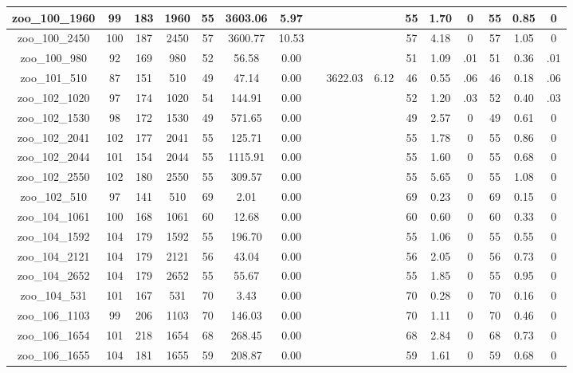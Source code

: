 \begin{landscape}
\begin{longtable}{|c|c|c|c|c|c|c|c|c|c|c|c|c|c|c|c|}
zoo\_100\_1960 & 99 & 183 & 1960 & 55 & 3603.06 & 5.97 &  &  &  & 55 & 1.70 & 0 & 55 & 0.85 & 0 \\ \hline 
zoo\_100\_2450 & 100 & 187 & 2450 & 57 & 3600.77 & 10.53 &  &  &  & 57 & 4.18 & 0 & 57 & 1.05 & 0 \\ \hline 
zoo\_100\_980 & 92 & 169 & 980 & 52 & 56.58 & 0.00 &  &  &  & 51 & 1.09 & .01 & 51 & 0.36 & .01 \\ \hline 
zoo\_101\_510 & 87 & 151 & 510 & 49 & 47.14 & 0.00 &  & 3622.03 & 6.12 & 46 & 0.55 & .06 & 46 & 0.18 & .06 \\ \hline 
zoo\_102\_1020 & 97 & 174 & 1020 & 54 & 144.91 & 0.00 &  &  &  & 52 & 1.20 & .03 & 52 & 0.40 & .03 \\ \hline 
zoo\_102\_1530 & 98 & 172 & 1530 & 49 & 571.65 & 0.00 &  &  &  & 49 & 2.57 & 0 & 49 & 0.61 & 0 \\ \hline 
zoo\_102\_2041 & 102 & 177 & 2041 & 55 & 125.71 & 0.00 &  &  &  & 55 & 1.78 & 0 & 55 & 0.86 & 0 \\ \hline 
zoo\_102\_2044 & 101 & 154 & 2044 & 55 & 1115.91 & 0.00 &  &  &  & 55 & 1.60 & 0 & 55 & 0.68 & 0 \\ \hline 
zoo\_102\_2550 & 102 & 180 & 2550 & 55 & 309.57 & 0.00 &  &  &  & 55 & 5.65 & 0 & 55 & 1.08 & 0 \\ \hline 
zoo\_102\_510 & 97 & 141 & 510 & 69 & 2.01 & 0.00 &  &  &  & 69 & 0.23 & 0 & 69 & 0.15 & 0 \\ \hline 
zoo\_104\_1061 & 100 & 168 & 1061 & 60 & 12.68 & 0.00 &  &  &  & 60 & 0.60 & 0 & 60 & 0.33 & 0 \\ \hline 
zoo\_104\_1592 & 104 & 179 & 1592 & 55 & 196.70 & 0.00 &  &  &  & 55 & 1.06 & 0 & 55 & 0.55 & 0 \\ \hline 
zoo\_104\_2121 & 104 & 179 & 2121 & 56 & 43.04 & 0.00 &  &  &  & 56 & 2.05 & 0 & 56 & 0.73 & 0 \\ \hline 
zoo\_104\_2652 & 104 & 179 & 2652 & 55 & 55.67 & 0.00 &  &  &  & 55 & 1.85 & 0 & 55 & 0.95 & 0 \\ \hline 
zoo\_104\_531 & 101 & 167 & 531 & 70 & 3.43 & 0.00 &  &  &  & 70 & 0.28 & 0 & 70 & 0.16 & 0 \\ \hline 
zoo\_106\_1103 & 99 & 206 & 1103 & 70 & 146.03 & 0.00 &  &  &  & 70 & 1.11 & 0 & 70 & 0.46 & 0 \\ \hline 
zoo\_106\_1654 & 101 & 218 & 1654 & 68 & 268.45 & 0.00 &  &  &  & 68 & 2.84 & 0 & 68 & 0.73 & 0 \\ \hline 
zoo\_106\_1655 & 104 & 181 & 1655 & 59 & 208.87 & 0.00 &  &  &  & 59 & 1.61 & 0 & 59 & 0.68 & 0 \\ \hline 

\end{longtable}
\end{landscape}
